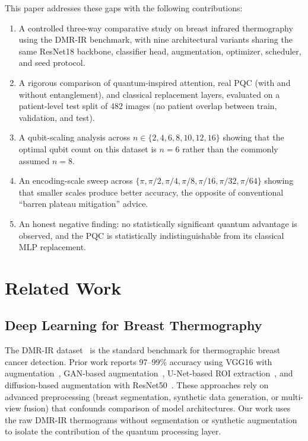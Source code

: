 \documentclass[conference]{IEEEtran}
\begin{document}
This paper addresses these gaps with the following contributions:
\begin{enumerate}
\item A controlled three-way comparative study on breast infrared thermography using the DMR-IR benchmark, with nine architectural variants sharing the same ResNet18 backbone, classifier head, augmentation, optimizer, scheduler, and seed protocol.
\item A rigorous comparison of quantum-inspired attention, real PQC (with and without entanglement), and classical replacement layers, evaluated on a patient-level test split of 482 images (no patient overlap between train, validation, and test).
\item A qubit-scaling analysis across $n \in \{2, 4, 6, 8, 10, 12, 16\}$ showing that the optimal qubit count on this dataset is $n = 6$ rather than the commonly assumed $n = 8$.
\item An encoding-scale sweep across $\{\pi, \pi/2, \pi/4, \pi/8, \pi/16, \pi/32, \pi/64\}$ showing that smaller scales produce better accuracy, the opposite of conventional ``barren plateau mitigation'' advice.
\item An honest negative finding: no statistically significant quantum advantage is observed, and the PQC is statistically indistinguishable from its classical MLP replacement.
\end{enumerate}

\section{Related Work}

\subsection{Deep Learning for Breast Thermography}
The DMR-IR dataset~\cite{silva2014new} is the standard benchmark for thermographic breast cancer detection. Prior work reports 97--99\% accuracy using VGG16 with augmentation~\cite{ahmed2023vgg16}, GAN-based augmentation~\cite{bcdgan2025}, U-Net-based ROI extraction~\cite{unet_breast2020}, and diffusion-based augmentation with ResNet50~\cite{diffusion_thermo2024}. These approaches rely on advanced preprocessing (breast segmentation, synthetic data generation, or multi-view fusion) that confounds comparison of model architectures. Our work uses the raw DMR-IR thermograms without segmentation or synthetic augmentation to isolate the contribution of the quantum processing layer.
\end{document}
